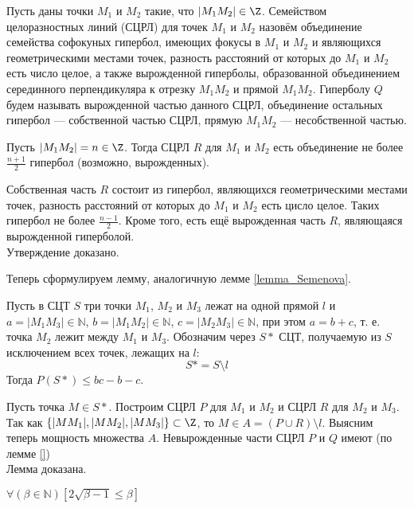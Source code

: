 \documentclass[a4paper,14pt]{article}
\begin{document}
\begin{opr}
	Пусть даны точки $M_1$ и $M_2$ такие, что $|M_1 M_2|\in\Z$.
	Семейством целоразностных линий (СЦРЛ) для точек $M_1$ и $M_2$ назовём объединение семейства софокуных гипербол,
	имеющих фокусы в $M_1$ и $M_2$ и являющихся геометрическими местами точек, разность расстояний от которых до $M_1$ и $M_2$ есть число целое,
	а также вырожденной гиперболы,
	образованной объединением серединного перпендикуляра к отрезку $M_1 M_2$ и прямой $M_1 M_2$.
	Гиперболу $Q$ будем называть вырожденной частью данного СЦРЛ,
	объединение остальных гипербол --- собственной частью СЦРЛ,
	прямую $M_1 M_2$ --- несобственной частью.
\end{opr}

\begin{utverzhd}
	Пусть $|M_1 M_2|= n \in\Z$.
	Тогда СЦРЛ $R$ для $M_1$ и $M_2$ есть объединение не более $\frac{n+1}{2}$ гипербол (возможно, вырожденных).
\end{utverzhd}

\dokvo
	Собственная часть $R$ состоит из гипербол, являющихся геометрическими местами точек,
	разность расстояний от которых до $M_1$ и $M_2$ есть цисло целое.
	Таких гипербол не более $\frac{n-1}{2}$.
	Кроме того, есть ещё вырожденная часть $R$, являющаяся вырожденной гиперболой.
\\ Утверждение доказано.

Теперь сформулируем лемму, аналогичную лемме \ref{lemma_Semenova}.

\begin{lemma}
	Пусть в СЦТ $S$ три точки $M_1$, $M_2$ и $M_3$ лежат на одной прямой $l$ и 
	$a=|M_1 M_3| \in \mathbb{N}$,
	$b=|M_1 M_2| \in \mathbb{N}$,
	$c=|M_2 M_3| \in \mathbb{N}$,
	при этом $a=b+c$, т. е. точка $M_2$ лежит между $M_1$ и $M_3$.
	Обозначим через $S*$ СЦТ, получаемую из $S$ исключением всех точек, лежащих на $l$:
	$$
		S* = S \setminus l
	$$
	Тогда
	$P(S*) \leq bc-b-c$.
\end{lemma}

\dokvo
	Пусть точка $M \in S*$.
	Построим СЦРЛ $P$ для $M_1$ и $M_2$ и СЦРЛ $R$ для $M_2$ и $M_3$.
	Так как $\{|M M_1|,|M M_2|,|M M_3|\}\subset\Z$, то $M\in A = (P\cup R)\setminus l$.
	Выясним теперь мощность множества $A$.
	Невырожденные части СЦРЛ $P$ и $Q$ имеют (по лемме \ref{})
\\ Лемма доказана.


\begin{utverzhd}[вспомогательное]
	$\forall \left(\beta \in \mathbb N\right)\left[  2 \sqrt{\beta - 1} \leq \beta \right]$
\end{utverzhd}
\end{document}
